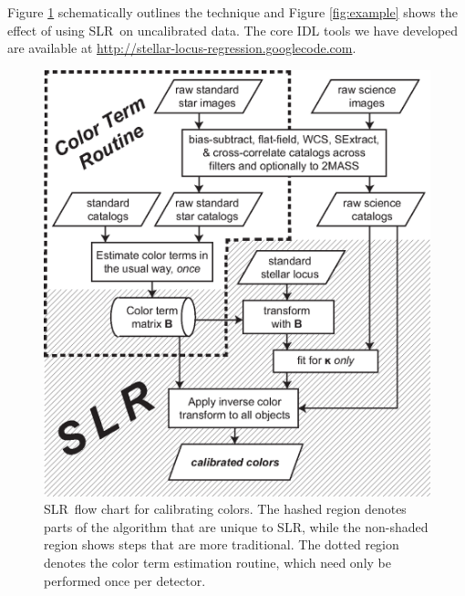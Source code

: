 \documentclass{report}
\newcommand{\slr}{SLR}
\begin{document}
Figure \ref{fig:algorithm} schematically outlines the technique and
Figure \ref{fig:example} shows the effect of using \slr\ on
uncalibrated data.  The core IDL tools we have developed are available
at \url{http://stellar-locus-regression.googlecode.com}.

\begin{figure}
\center
\includegraphics[scale=0.9]{fig/slr_algorithm.eps}
\caption{ \slr\ flow chart for calibrating colors.  The hashed region
  denotes parts of the algorithm that are unique to \slr, while the
  non-shaded region shows steps that are more traditional.  The dotted
  region denotes the color term estimation routine, which need only be
  performed once per detector. }
\label{fig:algorithm}
\end{figure}
\end{document}

